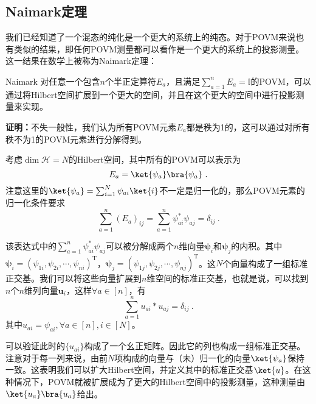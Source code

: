 \subsection{Naimark定理}
我们已经知道了一个混态的纯化是一个更大的系统上的纯态。对于POVM来说也有类似的结果，即任何POVM测量都可以看作是一个更大的系统上的投影测量。这一结果在数学上被称为Naimark定理：
\begin{theorem}{Naimark}
对任意一个包含$n$个半正定算符$E_a$，且满足$\sum_{a=1}^n E_a=\mathbb{I}$的POVM，可以通过将Hilbert空间扩展到一个更大的空间，并且在这个更大的空间中进行投影测量来实现。
\end{theorem}

\textbf{证明：}不失一般性，我们认为所有POVM元素$E_a$都是秩为1的，这可以通过对所有秩不为1的POVM元素进行分解得到。

考虑$\operatorname{dim}\mathcal{H}=N$的Hilbert空间，其中所有的POVM可以表示为
\begin{equation}
E_a=\ket{\psi_a}\bra{\psi_a}~.
\end{equation}
注意这里的$\ket{\psi_a}=\sum_{i=1}^N\psi_{ai}\ket{i}$不一定是归一化的，那么POVM元素的归一化条件要求
\begin{equation}
\sum_{a=1}^n\left(E_a\right)_{i j}=\sum_{a=1}^n \psi_{a i}^* \psi_{a j}=\delta_{i j}~.
\end{equation}

该表达式中的$\sum_{a=1}^n \psi_{a i}^* \psi_{a j}$可以被分解成两个$n$维向量$\boldsymbol{\psi}_i$和$\boldsymbol{\psi}_j$的内积。其中$\boldsymbol{\psi}_i=\left(\psi_{1 i}, \psi_{2 i}, \cdots, \psi_{n i}\right)^{\mathrm{T}}$，$\boldsymbol{\psi}_j=\left(\psi_{1 j}, \psi_{2 j}, \cdots, \psi_{n j}\right)^{\mathrm{T}}$。这$N$个向量构成了一组标准正交基。我们可以将这些向量扩展到$n$维空间的标准正交基，也就是说，可以找到$n$个$n$维列向量$\boldsymbol{u}_i$，这样$\forall a\in[n]$，有
\begin{equation}
\sum_{a=1}^n u_{a i}*u_{a j}=\delta_{ij}~.
\end{equation}
其中$u_{ai}=\psi_{ai},\forall a\in[n],i\in[N]$。

可以验证此时的$\{u_{ai}\}$构成了一个幺正矩阵。因此它的列也构成一组标准正交基。注意对于每一列来说，由前$N$项构成的向量与（未）归一化的向量$\ket{\psi_a}$保持一致。这表明我们可以扩大Hilbert空间，并定义其中的标准正交基$\ket{u}$。在这种情况下，POVM就被扩展成为了更大的Hilbert空间中的投影测量，这种测量由$\ket{u_a}\bra{u_a}$给出。

